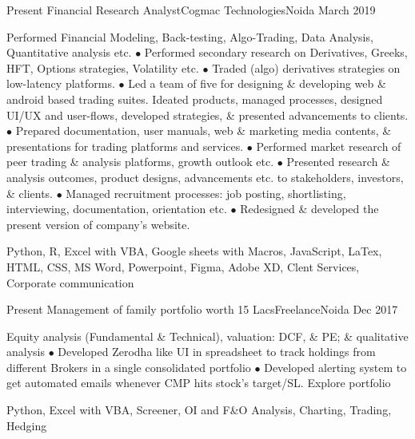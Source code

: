 
\begin{experiences}
  \experience
    {Present}   {Financial Research Analyst}{Cogmac Technologies}{Noida}
    {March 2019}
    {
\begin{description}
Performed Financial Modeling, Back-testing, Algo-Trading, Data Analysis, Quantitative analysis etc. $\bullet$ Performed secondary research on Derivatives, Greeks, HFT, Options strategies, Volatility etc. $\bullet$ Traded (algo) derivatives strategies on low-latency platforms. $\bullet$ Led a team of five for designing \& developing web \& android based trading suites. Ideated products, managed processes, designed UI/UX and user-flows, developed strategies, \& presented advancements to clients. $\bullet$ Prepared documentation, user manuals, web \& marketing media contents, \& presentations for trading platforms and services. $\bullet$ Performed market research of peer trading \& analysis platforms, growth outlook etc. $\bullet$ Presented research \& analysis outcomes, product designs, advancements etc. to stakeholders, investors, \& clients. $\bullet$ Managed recruitment processes: job posting, shortlisting, interviewing, documentation, orientation etc. $\bullet$ Redesigned \& developed the present version of company's website. \hspace \hfill {}
\end{description}
}
        {Python, R, Excel with VBA, Google sheets with Macros, JavaScript, LaTex, HTML, CSS, MS Word, Powerpoint, Figma, Adobe XD, Clent Services, Corporate communication}
\end{experiences}
\vspace*{-15px} 
\begin{experiences}
   \experience
    {Present}{\vspace*{-15px} Management of family portfolio worth 15 Lacs}{Freelance}{Noida}
    {Dec 2017}
    {
\begin{description}
        Equity analysis (Fundamental \& Technical), valuation: DCF, \& PE; \& qualitative analysis $\bullet$ Developed Zerodha like UI in spreadsheet to track holdings from different Brokers in a single consolidated portfolio $\bullet$ Developed alerting system to get automated emails whenever CMP hits stock's target/SL. \hfill {} {\footnotesize{Explore portfolio}}
    \end{description}
    }
        {Python, Excel with VBA, Screener, OI and F\&O Analysis, Charting, Trading, Hedging}
\end{experiences}
